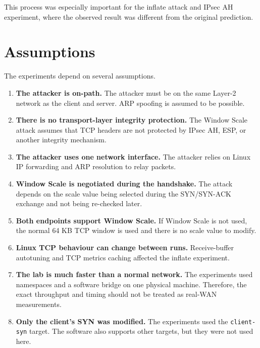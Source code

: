 \documentclass[11pt]{article}
\begin{document}
This process was especially important for the inflate attack and
IPsec AH experiment, where the observed result was different from
the original prediction.

\section{Assumptions}

The experiments depend on several assumptions.

\begin{enumerate}
    \item \textbf{The attacker is on-path.}
    The attacker must be on the same Layer-2 network as the client
    and server. ARP spoofing is assumed to be possible.

    \item \textbf{There is no transport-layer integrity protection.}
    The Window Scale attack assumes that TCP headers are not protected
    by IPsec AH, ESP, or another integrity mechanism.

    \item \textbf{The attacker uses one network interface.}
    The attacker relies on Linux IP forwarding and ARP resolution
    to relay packets.

    \item \textbf{Window Scale is negotiated during the handshake.}
    The attack depends on the scale value being selected during the
    SYN/SYN-ACK exchange and not being re-checked later.

    \item \textbf{Both endpoints support Window Scale.}
    If Window Scale is not used, the normal 64 KB TCP window is used
    and there is no scale value to modify.

    \item \textbf{Linux TCP behaviour can change between runs.}
    Receive-buffer autotuning and TCP metrics caching affected the
    inflate experiment.

    \item \textbf{The lab is much faster than a normal network.}
    The experiments used namespaces and a software bridge on one
    physical machine. Therefore, the exact throughput and timing
    should not be treated as real-WAN measurements.

    \item \textbf{Only the client's SYN was modified.}
    The experiments used the \texttt{client-syn} target. The software
    also supports other targets, but they were not used here.


\end{enumerate}
\end{document}
